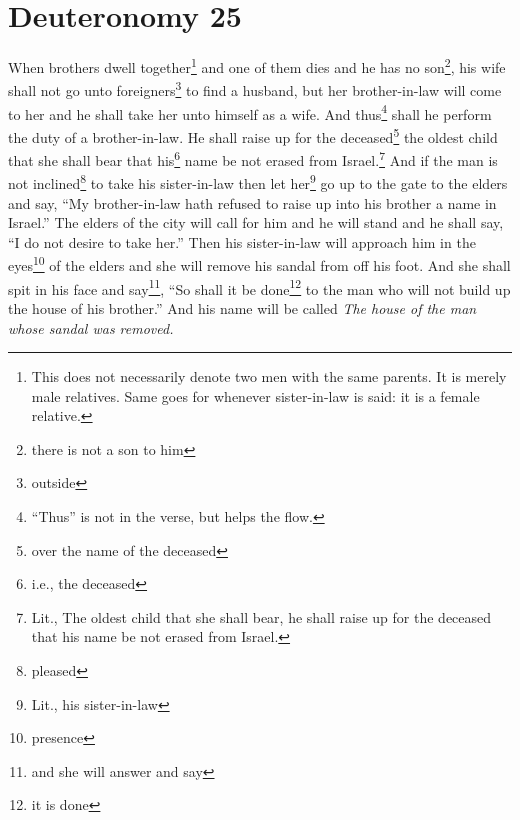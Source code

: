 \section{Deuteronomy 25}\label{Deuteronomy 25}
\begin{enumerate}[align=center]
     When brothers dwell together\footnote{This does not necessarily denote two men with the same parents. It is merely male relatives. Same goes for whenever sister-in-law is said: it is a female relative.} and one of them dies and he has no son\footnote{there is not a son to him}, his wife shall not go unto foreigners\footnote{outside} to find a husband, but her brother-in-law will come to her and he shall take her unto himself as a wife. And thus\footnote{``Thus'' is not in the verse, but helps the flow.} shall he perform the duty of a brother-in-law.%
     He shall raise up for the deceased\footnote{over the name of the deceased} the oldest child that she shall bear that his\footnote{i.e., the deceased} name be not erased from Israel.\footnote{Lit., The oldest child that she shall bear, he shall raise up for the deceased that his name be not erased from Israel.}%
     And if the man is not inclined\footnote{pleased} to take his sister-in-law then let her\footnote{Lit., his sister-in-law} go up to the gate to the elders and say, ``My brother-in-law hath refused to raise up into his brother a name in Israel.''%
     The elders of the city will call for him and he will stand and he shall say, ``I do not desire to take her.''%
     Then his sister-in-law will approach him in the eyes\footnote{presence} of the elders and she will remove his sandal from off his foot. And she shall spit in his face and say\footnote{and she will answer and say}, ``So shall it be done\footnote{it is done} to the man who will not build up the house of his brother.''%
     And his name will be called \emph{The house of the man whose sandal was removed.}%
\end{enumerate}
